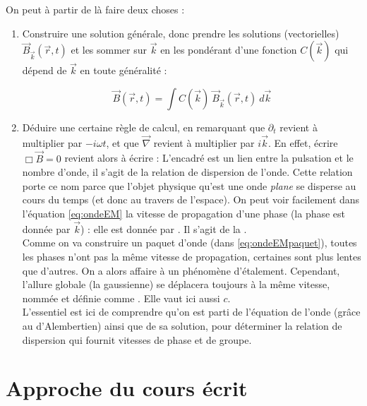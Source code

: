 \documentclass[11pt]{book}
\begin{document}
On peut à partir de là faire deux choses :
\begin{enumerate}
\item Construire une solution générale, donc prendre les solutions (vectorielles) $\vec{B}_{\vec{k}}(\vec{r},t)$ et les sommer sur $\vec{k}$ en les pondérant d'une fonction $C(\vec{k})$ qui dépend de $\vec{k}$ en toute généralité :
\begin{large}
\begin{equation}\label{eq:ondeEMpaquet}
\vec{B}(\vec{r},t) = \int C(\vec{k})\ \vec{B}_{\vec{k}}(\vec{r},t) \ d\vec{k}
\end{equation}
\end{large}
\item Déduire une certaine règle de calcul, en remarquant que $\partial_t$ revient à multiplier par $-i\omega t$, et que $\vec{\nabla}$ revient à multiplier par $i\vec{k}$. En effet, écrire $\Box \vec{B} = 0$ revient alors à écrire :
L'encadré est un lien entre la pulsation et le nombre d'onde, il s'agit de la relation de dispersion de l'onde. Cette relation porte ce nom parce que l'objet physique qu'est une onde \textit{plane} se disperse au cours du temps (et donc au travers de l'espace). On peut voir facilement dans l'équation \ref{eq:ondeEM} la vitesse de propagation d'une phase (la phase est donnée par $\vec{k}$) : elle est donnée par . Il s'agit de la . \\

Comme on va construire un paquet d'onde (dans \ref{eq:ondeEMpaquet}), toutes les phases n'ont pas la même vitesse de propagation, certaines sont plus lentes que d'autres. On a alors affaire à un phénomène d'étalement. Cependant, l'allure globale (la gaussienne) se déplacera toujours à la même vitesse, nommée  et définie comme . Elle vaut ici aussi $c$. \\

L'essentiel est ici de comprendre qu'on est parti de l'équation de l'onde (grâce au d'Alembertien) ainsi que de sa solution, pour déterminer la relation de dispersion qui fournit vitesses de phase et de groupe.
\end{enumerate}
\section*{Approche du cours écrit}
\end{document}
